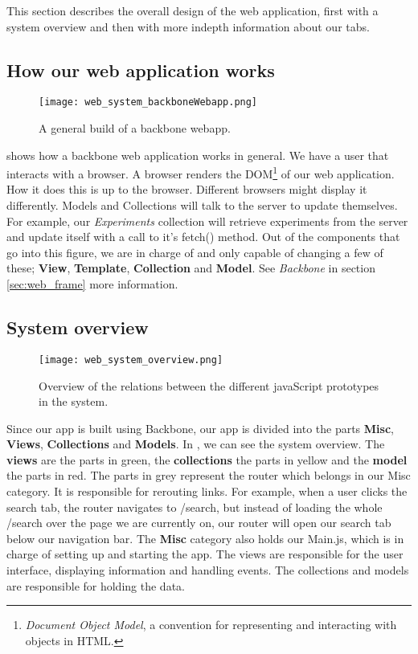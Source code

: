 This section describes the overall design of the web application, first with a system overview and then with more indepth information about our tabs.
\subsection{How our web application works}
\begin{figure}[h]
\centering
\texttt{[image: web\_system\_backboneWebapp.png]}
\caption{\label{fig:web_system_backboneWebapp}A general build of a backbone webapp.}
\end{figure}

 shows how a backbone\cite{web_1} web application works in general. We have a user that interacts with a browser. A browser renders the DOM\footnote{\textit{Document Object Model}, a convention for representing and interacting with objects in HTML.} of our web application. How it does this is up to the browser. Different browsers might display it differently. Models and Collections will talk to the server to update themselves. For example, our \textit{Experiments} collection will retrieve experiments from the server and update itself with a call to it’s fetch() method. Out of the components that go into this figure, we are in charge of and only capable of changing a few of these; \textbf{View}, \textbf{Template}, \textbf{Collection} and \textbf{Model}. See \textit{Backbone} in section \ref{sec:web_frame} more information.
\subsection{System overview}
\begin{figure}[h]
\centering
\texttt{[image: web\_system\_overview.png]}
\caption{\label{fig:web_system_overview}Overview of the relations between the different javaScript prototypes in the system.}
\end{figure}

Since our app is built using Backbone\cite{web_1}, our app is divided into the parts \textbf{Misc}, \textbf{Views}, \textbf{Collections} and \textbf{Models}. In , we can see the system overview. The \textbf{views} are the parts in green, the \textbf{collections} the parts in yellow and the \textbf{model} the parts in red. The parts in grey represent the router which belongs in our Misc category. It is responsible for rerouting links. For example, when a user clicks the search tab, the router navigates to /search, but instead of loading the whole /search over the page we are currently on, our router will open our search tab below our navigation bar. The \textbf{Misc} category also holds our Main.js, which is in charge of setting up and starting the app. The views are responsible for the user interface, displaying information and handling events. The collections and models are responsible for holding the data.


